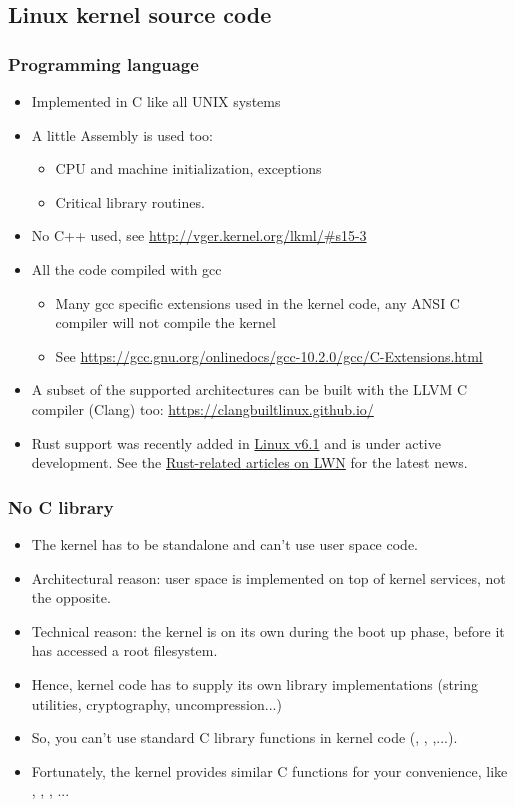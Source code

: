 \subsection{Linux kernel source code}

\begin{frame}
  \frametitle{Programming language}
  \begin{itemize}
  \item Implemented in C like all UNIX systems
  \item A little Assembly is used too:
    \begin{itemize}
    \item CPU and machine initialization, exceptions
    \item Critical library routines.
    \end{itemize}
  \item No C++ used, see \url{http://vger.kernel.org/lkml/\#s15-3}
  \item All the code compiled with gcc
    \begin{itemize}
    \item Many gcc specific extensions used in the kernel code, any
      ANSI C compiler will not compile the kernel
    \item See
      \url{https://gcc.gnu.org/onlinedocs/gcc-10.2.0/gcc/C-Extensions.html}
    \end{itemize}
    \item A subset of the supported architectures can be built with the
      LLVM C compiler (Clang) too: \url{https://clangbuiltlinux.github.io/}
    \item Rust support was recently added in \href{https://lwn.net/Articles/910762/}{Linux v6.1}
      and is under active development.
      See the \href{https://lwn.net/Kernel/Index/\#Development\_tools-Rust}{Rust-related articles on
      LWN} for the latest news.
  \end{itemize}
\end{frame}

\begin{frame}
  \frametitle{No C library}
  \begin{itemize}
  \item The kernel has to be standalone and can't use user space code.
  \item Architectural reason: user space is implemented on top of kernel services, not the
    opposite.
  \item Technical reason: the kernel is on its own during the boot up
    phase, before it has accessed a root filesystem.
  \item Hence, kernel code has to supply its own library implementations
    (string utilities, cryptography, uncompression...)
  \item So, you can't use standard C library functions in kernel code
    (, , ,...).
  \item Fortunately, the kernel provides similar C functions for your
    convenience, like , ,
    , ...
  \end{itemize}
\end{frame}

